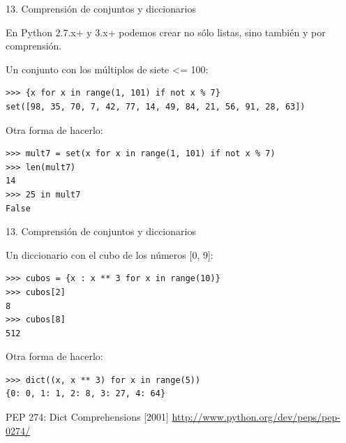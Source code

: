 \documentclass[14pt]{beamer}
\begin{document}
\begin{frame}[fragile]{13. \large Comprensión de conjuntos y diccionarios}
  \begin{block}{}
  \centering
    En Python 2.7.x+ y 3.x+ podemos crear no sólo listas, sino también
     y  por comprensión.
  \end{block}

  \scriptsize
  \begin{exampleblock}
    {Un conjunto con los múltiplos de siete <= 100:}
    \begin{lstlisting}
>>> {x for x in range(1, 101) if not x % 7}
set([98, 35, 70, 7, 42, 77, 14, 49, 84, 21, 56, 91, 28, 63])
    \end{lstlisting}
  \end{exampleblock}

  \begin{exampleblock}
    {Otra forma de hacerlo:}
    \begin{lstlisting}
>>> mult7 = set(x for x in range(1, 101) if not x % 7)
>>> len(mult7)
14
>>> 25 in mult7
False
    \end{lstlisting}
  \end{exampleblock}
\end{frame}

\begin{frame}[fragile]{13. \large Comprensión de conjuntos y diccionarios}
  \scriptsize
  \begin{exampleblock}
    {Un diccionario con el cubo de los números [0, 9]:}
    \begin{lstlisting}
>>> cubos = {x : x ** 3 for x in range(10)}
>>> cubos[2]
8
>>> cubos[8]
512
    \end{lstlisting}
  \end{exampleblock}

  \begin{exampleblock}
    {Otra forma de hacerlo:}
    \begin{lstlisting}
>>> dict((x, x ** 3) for x in range(5))
{0: 0, 1: 1, 2: 8, 3: 27, 4: 64}
    \end{lstlisting}
  \end{exampleblock}

  \small
  \begin{block}
    {\centering PEP 274: Dict Comprehensions [2001]}
    \centering \url{http://www.python.org/dev/peps/pep-0274/}
  \end{block}
\end{frame}
\end{document}
